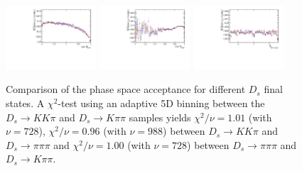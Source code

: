 \begin{figure}[h]
\includegraphics[height=!,width=0.3\textwidth]{figs/AcceptancePhsp/eff_cosTheta_Kpi_Ds.pdf}
\includegraphics[height=!,width=0.3\textwidth]{figs/AcceptancePhsp/eff_cosTheta_Dspi_Ds.pdf}
\includegraphics[height=!,width=0.3\textwidth]{figs/AcceptancePhsp/eff_phi_Kpi_Dspi_Ds.pdf}

\caption{Comparison of the phase space acceptance for different $D_s$ final states.
A $\chi^2$-test using an adaptive 5D binning between the $D_s \to KK\pi$ and $D_s \to K\pi\pi$ samples yields $\chi^2/\nu = 1.01$ (with $\nu = 728$), 
$\chi^2/\nu = 0.96$ (with $\nu = 988$) between $D_s \to KK\pi$ and $D_s \to \pi\pi\pi$ and 
$\chi^2/\nu = 1.00$ (with $\nu = 728$) between $D_s \to \pi\pi\pi$ and $D_s \to K\pi\pi$. }
\label{fig:PhspEffDs}
\end{figure}



